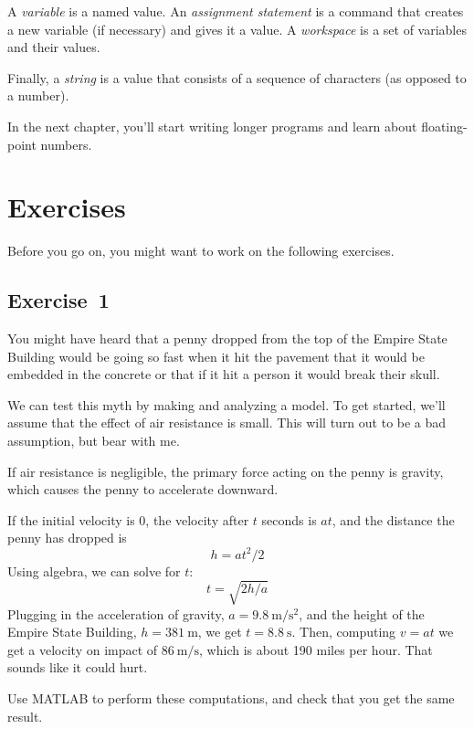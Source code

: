 A \emph{variable} is a named value. An \emph{assignment statement} is a command that creates a new variable (if necessary) and gives it a value.
A \emph{workspace} is a set of variables and their values.

Finally, a \emph{string} is a value that consists of a sequence of characters (as opposed to a number).

In the next chapter, you'll start writing longer programs and learn about floating-point numbers.

\section{Exercises}

Before you go on, you might want to work on the following exercises.

\subsection{Exercise~1}
\label{penny}
You might have heard that a penny dropped from the top of the Empire State Building would be going so fast when it hit the pavement that it would be embedded in the concrete or that if it hit a person it would break their skull.


We can test this myth by making and analyzing a model.  To get started, we'll assume that the effect of air resistance is small.  This will turn out to be a bad assumption, but bear with me.

If air resistance is negligible, the primary force acting on the penny is gravity, which causes the penny to accelerate downward.


If the initial velocity is 0, the velocity after $t$ seconds is $a t$, and the distance the penny has dropped is
%
\[ h = a t^2 / 2 \]
%
Using algebra, we can solve for $t$:
%
\[ t = \sqrt{ 2 h / a} \]
%
Plugging in the acceleration of gravity,
$a = \SI{9.8}{\meter\per\second\squared}$, and the height of the Empire State Building,
$h = \SI{381}{\meter}$, we get
$t = \SI{8.8}{\second}$.
Then, computing $v = a t$ we get a velocity on impact of $\SI{86}{\meter\per\second}$, which is about 190 miles per hour.  That sounds like it could hurt.

Use MATLAB to perform these computations, and check that you get the same result.

